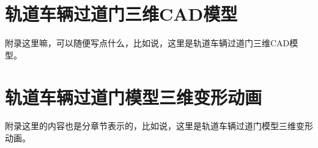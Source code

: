 \newpage
\begin{center}
    \heiti\bfseries\xiaoer{}
\end{center}
\section{轨道车辆过道门三维CAD模型}
附录这里嘛，可以随便写点什么，比如说，这里是轨道车辆过道门三维CAD模型。
\section{轨道车辆过道门模型三维变形动画}
附录这里的内容也是分章节表示的，比如说，这里是轨道车辆过道门模型三维变形动画。

